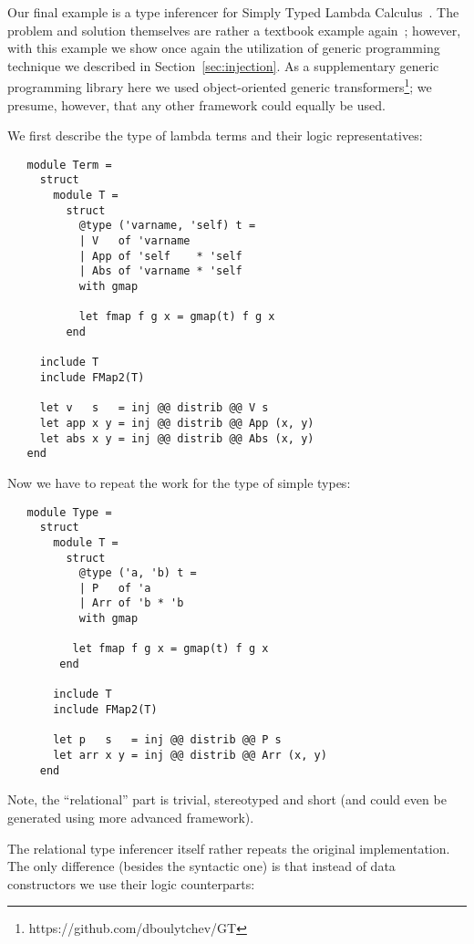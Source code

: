 Our final example is a type inferencer for Simply Typed Lambda Calculus~\cite{Lambda}. The problem and 
solution themselves are rather a textbook example again~\cite{TRS, WillThesis}; however, with this example
we show once again the utilization of generic programming technique we described in Section~\ref{sec:injection}.
As a supplementary generic programming library here we used object-oriented generic transformers\footnote{https://github.com/dboulytchev/GT}; 
we presume, however, that any other framework could equally be used.

We first describe the type of lambda terms and their logic representatives:

\begin{lstlisting}
   module Term = 
     struct
       module T = 
         struct
           @type ('varname, 'self) t =
           | V   of 'varname
           | App of 'self    * 'self
           | Abs of 'varname * 'self
           with gmap

           let fmap f g x = gmap(t) f g x
         end

     include T
     include FMap2(T)

     let v   s   = inj @@ distrib @@ V s
     let app x y = inj @@ distrib @@ App (x, y)
     let abs x y = inj @@ distrib @@ Abs (x, y)
   end
\end{lstlisting}

Now we have to repeat the work for the type of simple types:

\begin{lstlisting}
   module Type = 
     struct
       module T = 
         struct    
           @type ('a, 'b) t = 
           | P   of 'a    
           | Arr of 'b * 'b 
           with gmap

          let fmap f g x = gmap(t) f g x
        end

       include T
       include FMap2(T)

       let p   s   = inj @@ distrib @@ P s
       let arr x y = inj @@ distrib @@ Arr (x, y)
     end
\end{lstlisting}

Note, the ``relational'' part is trivial, stereotyped and short (and could even be generated 
using more advanced framework).

The relational type inferencer itself rather repeats the original implementation. The only
difference (besides the syntactic one) is that instead of data constructors we use their logic 
counterparts:

